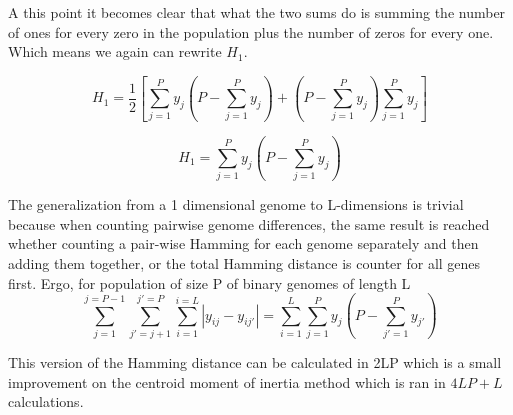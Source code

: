 A this point it becomes clear that what the two sums do is summing the number of ones for every zero in the population plus the number of zeros for every one. Which means we again can rewrite \(H_{1}\). 

\begin{equation*}
    H_{1} = \frac{1}{2}\left [\sum_{j=1}^{P}y_{j}\left (P - \sum_{j=1}^{P}y_{j} \right) + \left (P - \sum_{j=1}^{P}y_{j} \right)\sum_{j=1}^{P}y_{j}\right ]
\end{equation*}

\begin{equation}
    \label{eq:linearHamming}
    H_{1} = \sum_{j=1}^{P}y_{j}\left (P - \sum_{j=1}^{P}y_{j} \right)
\end{equation}

The generalization from a 1 dimensional genome to L-dimensions is trivial because when counting pairwise genome differences, the same result is reached whether counting a pair-wise Hamming for each genome separately and then adding them together, or the total Hamming distance is counter for all genes first. Ergo, for population of size P of binary genomes of length L
\begin{equation}
    \label{eq:proved}
    \sum_{j=1}^{j=P-1}\sum_{{j}'=j+1}^{{j}'=P}\sum_{i=1}^{i=L}\left |y_{ij}-y_{i{j}'}\right | = \sum_{i=1}^{L}\sum_{j=1}^{P}y_{j}\left (P - \sum_{{j}'=1}^{P}y_{{j}'} \right)
\end{equation}

This version of the Hamming distance can be calculated in 2LP which is a small improvement on the centroid moment of inertia method which is ran in \(4LP + L\) calculations. 



